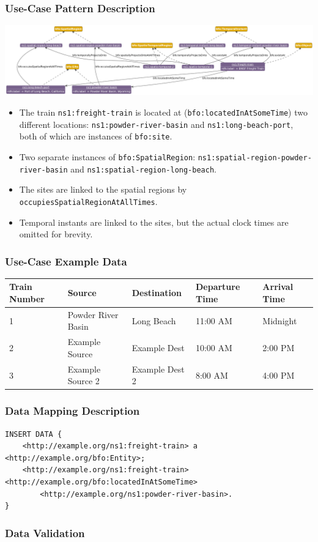 \subsubsection*{Use-Case Pattern Description}
\includegraphics[scale=0.27]{scenarios/location-change/images/change-of-location-usecase1.png}
\begin{itemize}
    \item The train \texttt{ns1:freight-train} is located at (\texttt{bfo:locatedInAtSomeTime}) two different locations: \texttt{ns1:powder-river-basin} and \texttt{ns1:long-beach-port}, both of which are instances of \texttt{bfo:site}.
    \item Two separate instances of \texttt{bfo:SpatialRegion}: \texttt{ns1:spatial-region-powder-river-basin} and \texttt{ns1:spatial-region-long-beach}.
    \item The sites are linked to the spatial regions by \texttt{occupiesSpatialRegionAtAllTimes}.
    \item Temporal instants are linked to the sites, but the actual clock times are omitted for brevity.
\end{itemize}

\subsubsection*{Use-Case Example Data}

\begin{tabularx}{\textwidth}{|X|l|X|X|X|}
\hline
Train Number & Source & Destination & Departure Time & Arrival Time \\
\hline
1            & Powder River Basin & Long Beach      & 11:00 AM      & Midnight       \\
2            & Example Source     & Example Dest    & 10:00 AM      & 2:00 PM        \\
3            & Example Source 2   & Example Dest 2  & 8:00 AM       & 4:00 PM        \\
\hline
\end{tabularx}

\subsubsection*{Data Mapping Description}

\begin{verbatim}
INSERT DATA {
    <http://example.org/ns1:freight-train> a <http://example.org/bfo:Entity>;
    <http://example.org/ns1:freight-train> <http://example.org/bfo:locatedInAtSomeTime> 
        <http://example.org/ns1:powder-river-basin>.
}
\end{verbatim}

\subsubsection*{Data Validation}